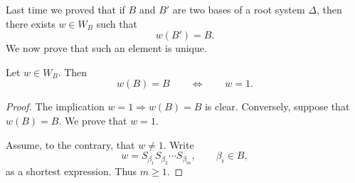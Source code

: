 
\begin{remark}
    Last time we proved that if \(B\) and \(B'\) are two bases of a root system
    \(\Delta\), then there exists \(w\in W_B\) such that
    \[
        w(B')=B.
    \]
    We now prove that such an element is unique.
\end{remark}

\begin{proposition}
    Let \(w\in W_B\). Then
    \[
        w(B)=B
        \qquad\Longleftrightarrow\qquad
        w=1.
    \]
\end{proposition}

\begin{proof}
    The implication \(w=1\Rightarrow w(B)=B\) is clear. Conversely, suppose
    that \(w(B)=B\). We prove that \(w=1\).

    Assume, to the contrary, that \(w\neq 1\). Write
    \[
        w=S_{\beta_1}S_{\beta_2}\cdots S_{\beta_m},
        \qquad \beta_i\in B,
    \]
    as a shortest expression. Thus \(m\geq 1\).


\end{proof}
